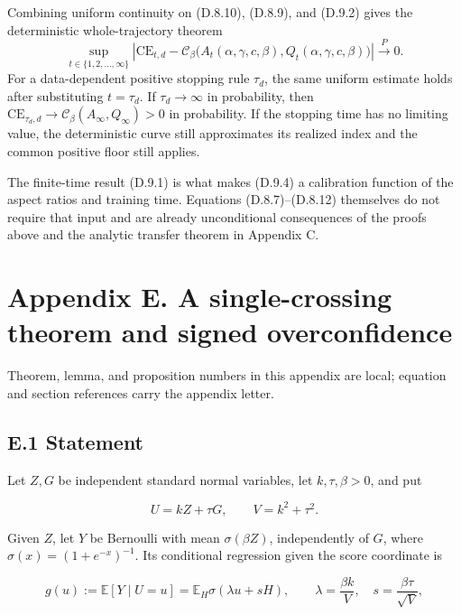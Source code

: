\documentclass[
  11pt,
  a4paper,
]{article}
\begin{document}
Combining uniform continuity on (D.8.10), (D.8.9), and (D.9.2) gives the
deterministic whole-trajectory theorem \[
\boxed{\quad
\sup_{t\in\{1,2,\ldots,\infty\}}
\left|\mathrm{CE}_{t,d}
-\mathcal C_\beta\big(A_t(\alpha,\gamma,c,\beta),
Q_t(\alpha,\gamma,c,\beta)\big)\right|
\xrightarrow{P}0.\quad}
\tag{D.9.4}
\] For a data-dependent positive stopping rule \(\tau_d\), the same
uniform estimate holds after substituting \(t=\tau_d\). If
\(\tau_d\to\infty\) in probability, then
\(\mathrm{CE}_{\tau_d,d}\to\mathcal C_\beta(A_\infty,Q_\infty)>0\) in
probability. If the stopping time has no limiting value, the
deterministic curve still approximates its realized index and the common
positive floor still applies.

The finite-time result (D.9.1) is what makes (D.9.4) a calibration
function of the aspect ratios and training time. Equations
(D.8.7)--(D.8.12) themselves do not require that input and are already
unconditional consequences of the proofs above and the analytic transfer
theorem in Appendix C.

\clearpage

\hypertarget{appendix-e.-a-single-crossing-theorem-and-signed-overconfidence}{%
\section{Appendix E. A single-crossing theorem and signed
overconfidence}\label{appendix-e.-a-single-crossing-theorem-and-signed-overconfidence}}

Theorem, lemma, and proposition numbers in this appendix are local;
equation and section references carry the appendix letter.

\hypertarget{e.1-statement}{%
\subsection{E.1 Statement}\label{e.1-statement}}

Let \(Z,G\) be independent standard normal variables, let
\(k,\tau,\beta>0\), and put

\[
U=kZ+\tau G,\qquad V=k^2+\tau^2.
\tag{E.1}
\]

Given \(Z\), let \(Y\) be Bernoulli with mean \(\sigma(\beta Z)\),
independently of \(G\), where \(\sigma(x)=(1+e^{-x})^{-1}\). Its
conditional regression given the score coordinate is

\[
g(u):=\mathbb E[Y\mid U=u]
=\mathbb E_H\sigma(\lambda u+sH),\qquad
\lambda=\frac{\beta k}{V},\quad s=\frac{\beta\tau}{\sqrt V},
\tag{E.2}
\]
\end{document}
